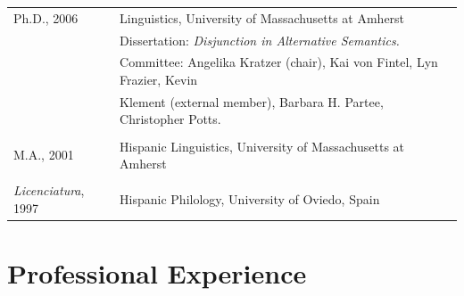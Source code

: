 \documentclass[11pt]{article}
\begin{document}
\begin{tabular}{p{2.815cm}p{280pt}}
Ph.D., 2006 &  Linguistics, University of Massachusetts at Amherst\\
 & {\footnotesize Dissertation: \textit{Disjunction in Alternative Semantics.}}\\
 &  {\footnotesize Committee: Angelika Kratzer (chair), Kai von Fintel, Lyn Frazier,
Kevin}\\
& {\footnotesize Klement (external member), Barbara H. Partee, Christopher Potts.}\\
&  \\[-8pt]
M.A., 2001   & Hispanic Linguistics, University of Massachusetts at Amherst\\
 &  \\[-8pt]
\textit{Licenciatura}, 1997  & Hispanic Philology,  University of Oviedo, Spain\\
\end{tabular}

\section*{Professional Experience}
\end{document}
